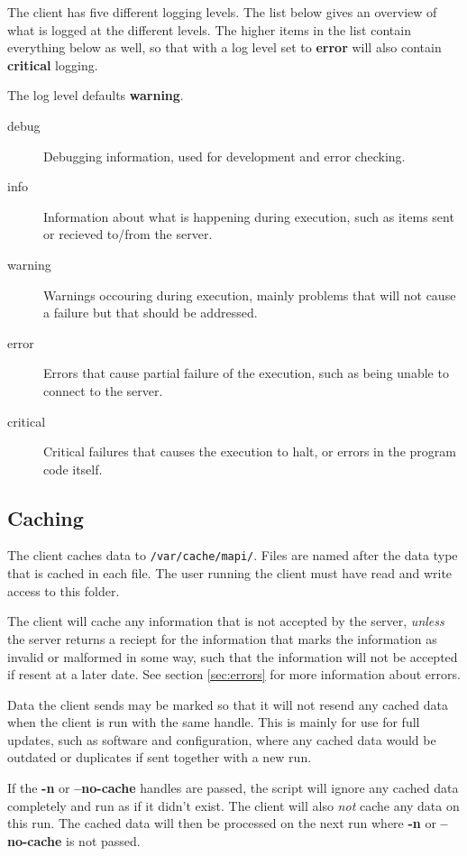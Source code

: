 The client has five different logging levels. The list below gives an overview
of what is logged at the different levels. The higher items in the list contain
everything below as well, so that with a log level set to \textbf{error} will
also contain \textbf{critical} logging.

The log level defaults \textbf{warning}. 

\begin{description}
    \item[debug]    Debugging information, used for development and error
    checking.
    \item[info] Information about what is happening during execution, such as
    items sent or recieved to/from the server.
    \item[warning]  Warnings occouring during execution, mainly problems that
    will not cause a failure but that should be addressed.
    \item[error]    Errors that cause partial failure of the execution, such as
    being unable to connect to the server.
    \item[critical] Critical failures that causes the execution to halt, or
    errors in the program code itself.
\end{description}

\subsection{Caching}
\label{sec:caching}
The client caches data to \texttt{/var/cache/mapi/}. Files are named after the
data type that is cached in each file. The user running the client must have
read and write access to this folder. 

The client will cache any information that is not accepted by the server, 
\textit{unless} the server returns a reciept for the information that marks the 
information as invalid or malformed in some way, such that the information will 
not be accepted if resent at a later date. See section \ref{sec:errors} for
more information about errors.

Data the client sends may be marked so that it will not resend any cached data
when the client is run with the same handle. This is mainly for use for full
updates, such as software and configuration, where any cached data would be
outdated or duplicates if sent together with a new run.

If the \textbf{-n} or \textbf{--no-cache} handles are passed, the script will
ignore any cached data completely and run as if it didn't exist. The client
will also \textit{not} cache any data on this run. The cached data will then be
processed on the next run where \textbf{-n} or \textbf{--no-cache} is not
passed. 
